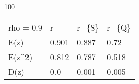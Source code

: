
100
\begin{tabular}{llll}
\hline
 rho = 0.9 & r     & r\_\{S\} & r\_\{Q\} \\
 E(z)      & 0.901 & 0.887 & 0.72  \\
 E(z\^{}2)    & 0.812 & 0.787 & 0.518 \\
 D(z)      & 0.0   & 0.001 & 0.005 \\
\hline
\end{tabular}